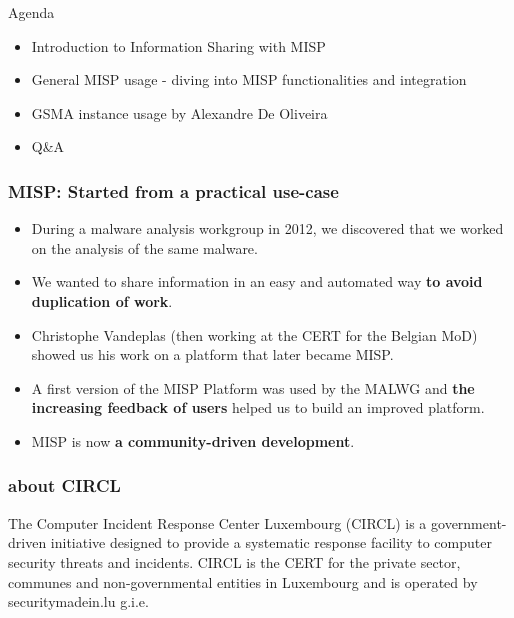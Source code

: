 
\begin{frame}[t,plain]
\titlepage
\end{frame}

\begin{frame}{Agenda}
    \begin{itemize}
        \item Introduction to Information Sharing with MISP
        \item General MISP usage - diving into MISP functionalities and integration
        \item GSMA instance usage by Alexandre De Oliveira
        \item Q\&A
    \end{itemize}
\end{frame}

\begin{frame}
 \frametitle{MISP: Started from a practical use-case}
 \begin{itemize}
         \item During a malware analysis workgroup in 2012, we discovered that we worked on the analysis of the same malware.
         \item We wanted to share information in an easy and automated way {\bf to avoid duplication of work}.
         \item Christophe Vandeplas (then working at the CERT for the Belgian MoD) showed us his work on a platform that later became MISP.
         \item A first version of the MISP Platform was used by the MALWG and {\bf the increasing feedback of users} helped us to build an improved platform.
         \item MISP is now {\bf a community-driven development}.
 \end{itemize}
\end{frame}

\begin{frame}
\frametitle{about CIRCL}
The Computer Incident Response Center Luxembourg (CIRCL) is a government-driven initiative designed to provide a systematic response facility to computer security threats and incidents. CIRCL is the CERT for the private sector, communes and non-governmental entities in Luxembourg and is operated by securitymadein.lu g.i.e.
\end{frame}

